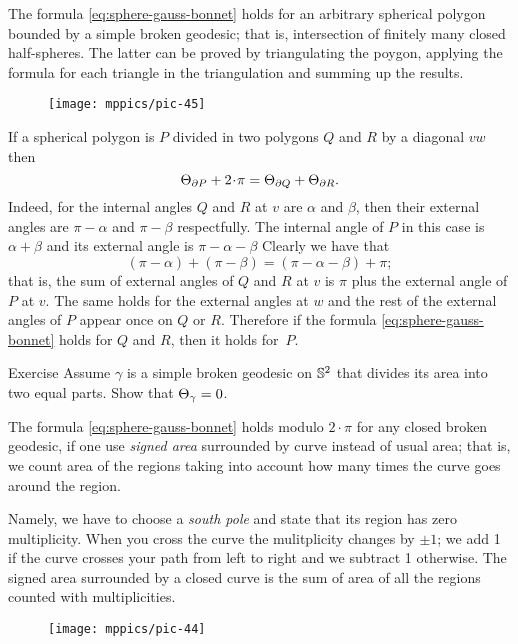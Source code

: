 The formula \ref{eq:sphere-gauss-bonnet} holds for an arbitrary spherical polygon bounded by a simple broken geodesic;
that is, intersection of finitely many closed half-spheres.
The latter can be proved by triangulating the poygon, applying the formula for each triangle in the triangulation and summing up the results.

\begin{wrapfigure}{o}{42 mm}
\vskip-0mm
\centering
\texttt{[image: mppics/pic-45]}
\vskip-0mm
\end{wrapfigure}

If a spherical polygon is $P$ divided in two polygons $Q$ and $R$ by a diagonal $vw$
then 
\[\tgc{\partial P}+2\cdot\pi =\tgc{\partial Q}+\tgc{\partial R}.\]
Indeed, for the internal angles $Q$ and $R$ at $v$ are $\alpha$ and $\beta$,
then their external angles are $\pi-\alpha$ and $\pi-\beta$ respectfully.
The internal angle of $P$ in this case is $\alpha+\beta$ and its external angle is $\pi-\alpha-\beta$
Clearly we have that 
\[(\pi-\alpha)+(\pi-\beta)=(\pi-\alpha-\beta)+\pi;\]
that is, the sum of external angles of $Q$ and $R$ at $v$ is $\pi$ plus the external angle of $P$ at $v$. 
The same holds for the external angles at $w$ and the rest of the external angles of $P$ appear once on $Q$ or $R$.
Therefore if the formula \ref{eq:sphere-gauss-bonnet} holds for $Q$ and $R$,
then it holds for~$P$.

\begin{thm}{Exercise}
Assume $\gamma$ is a simple broken geodesic on $\mathbb{S}^2$ that divides its area into two equal parts.
Show that $\Theta_{\gamma}=0$.
\end{thm}



The formula \ref{eq:sphere-gauss-bonnet} holds modulo $2\cdot \pi$ for any closed broken geodesic, if one use \emph{signed area} surrounded by curve instead of usual area;
that is, we count area of the regions taking into account how many times the curve goes around the region.

Namely, we have to choose a \emph{south pole} and state that its region has zero multiplicity.
When you cross the curve the mulitplicity changes by $\pm1$; we add 1 if the curve crosses your path from left to right and we subtract 1 otherwise.
The signed area surrounded by a closed curve is the sum of area of all the regions counted with multiplicities.

\begin{wrapfigure}{o}{32 mm}
\vskip-0mm
\centering
\texttt{[image: mppics/pic-44]}
\vskip-0mm
\end{wrapfigure}

